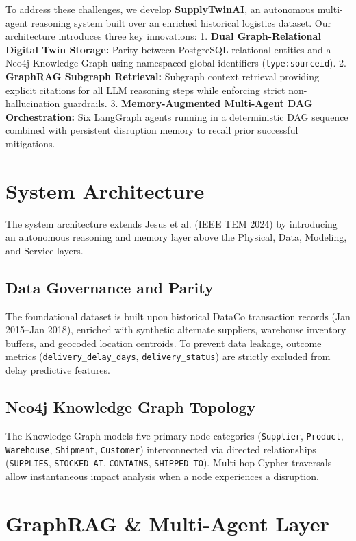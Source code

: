 \documentclass[journal]{IEEEtran}
\begin{document}
To address these challenges, we develop \textbf{SupplyTwinAI}, an autonomous multi-agent reasoning system built over an enriched historical logistics dataset. Our architecture introduces three key innovations:
1. \textbf{Dual Graph-Relational Digital Twin Storage:} Parity between PostgreSQL relational entities and a Neo4j Knowledge Graph using namespaced global identifiers (\texttt{type:sourceid}).
2. \textbf{GraphRAG Subgraph Retrieval:} Subgraph context retrieval providing explicit citations for all LLM reasoning steps while enforcing strict non-hallucination guardrails.
3. \textbf{Memory-Augmented Multi-Agent DAG Orchestration:} Six LangGraph agents running in a deterministic DAG sequence combined with persistent disruption memory to recall prior successful mitigations.

\section{System Architecture}
The system architecture extends Jesus et al. (IEEE TEM 2024) by introducing an autonomous reasoning and memory layer above the Physical, Data, Modeling, and Service layers.

\subsection{Data Governance and Parity}
The foundational dataset is built upon historical DataCo transaction records (Jan 2015--Jan 2018), enriched with synthetic alternate suppliers, warehouse inventory buffers, and geocoded location centroids. To prevent data leakage, outcome metrics (\texttt{delivery\_delay\_days}, \texttt{delivery\_status}) are strictly excluded from delay predictive features.

\subsection{Neo4j Knowledge Graph Topology}
The Knowledge Graph models five primary node categories (\texttt{Supplier}, \texttt{Product}, \texttt{Warehouse}, \texttt{Shipment}, \texttt{Customer}) interconnected via directed relationships (\texttt{SUPPLIES}, \texttt{STOCKED\_AT}, \texttt{CONTAINS}, \texttt{SHIPPED\_TO}). Multi-hop Cypher traversals allow instantaneous impact analysis when a node experiences a disruption.

\section{GraphRAG & Multi-Agent Layer}
\end{document}

